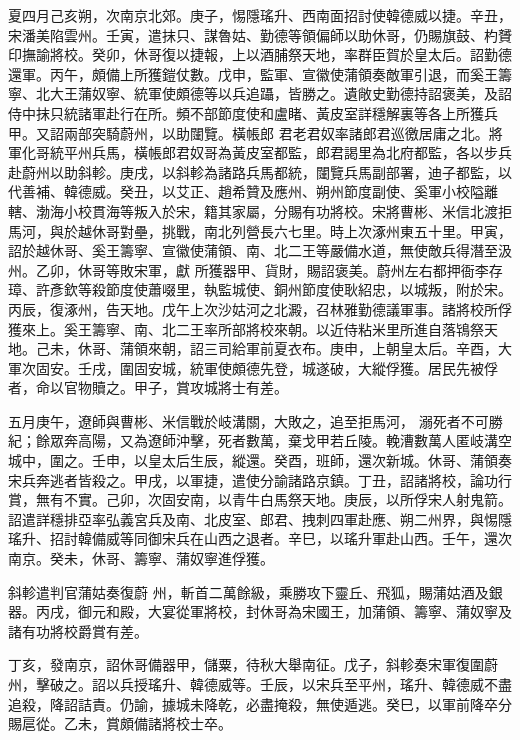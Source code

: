 \begin{pinyinscope}
 夏四月己亥朔，次南京北郊。庚子，惕隱瑤升、西南面招討使韓德威以捷。辛丑，宋潘美陷雲州。壬寅，遣抹只、謀魯姑、勤德等領偏師以助休哥，仍賜旗鼓、杓贇印撫諭將校。癸卯，休哥復以捷報，上以酒脯祭天地，率群臣賀於皇太后。詔勤德還軍。丙午，頗備上所獲鎧仗數。戊申，監軍、宣徽使蒲領奏敵軍引退，而奚王籌寧、北大王蒲奴寧、統軍使頗德等以兵追躡，皆勝之。遺敞史勤德持詔褒美，及詔侍中抹只統諸軍赴行在所。頻不部節度使和盧睹、黃皮室詳穩解裏等各上所獲兵甲。又詔兩部突騎蔚州，以助闥覽。橫帳郎
 君老君奴率諸郎君巡徼居庸之北。將軍化哥統平州兵馬，橫帳郎君奴哥為黃皮室都監，郎君謁里為北府都監，各以步兵赴蔚州以助斜軫。庚戌，以斜軫為諸路兵馬都統，闥覽兵馬副部署，迪子都監，以代善補、韓德威。癸丑，以艾正、趙希贊及應州、朔州節度副使、奚軍小校隘離轄、渤海小校貫海等叛入於宋，籍其家屬，分賜有功將校。宋將曹彬、米信北渡拒馬河，與於越休哥對壘，挑戰，南北列營長六七里。時上次涿州東五十里。甲寅，詔於越休哥、奚王籌寧、宣徽使蒲領、南、北二王等嚴備水道，無使敵兵得潛至汲州。乙卯，休哥等敗宋軍，獻
 所獲器甲、貨財，賜詔褒美。蔚州左右都押衙李存璋、許彥欽等殺節度使蕭啜里，執監城使、銅州節度使耿紹忠，以城叛，附於宋。丙辰，復涿州，告天地。戊午上次沙姑河之北澱，召林雅勤德議軍事。諸將校所俘獲來上。奚王籌寧、南、北二王率所部將校來朝。以近侍粘米里所進自落鴇祭天地。己未，休哥、蒲領來朝，詔三司給軍前夏衣布。庚申，上朝皇太后。辛酉，大軍次固安。壬戌，圍固安城，統軍使頗德先登，城遂破，大縱俘獲。居民先被俘者，命以官物贖之。甲子，賞攻城將士有差。



 五月庚午，遼師與曹彬、米信戰於岐溝關，大敗之，追至拒馬河，
 溺死者不可勝紀；餘眾奔高陽，又為遼師沖擊，死者數萬，棄戈甲若丘陵。輓漕數萬人匿岐溝空城中，圍之。壬申，以皇太后生辰，縱還。癸酉，班師，還次新城。休哥、蒲領奏宋兵奔逃者皆殺之。甲戌，以軍捷，遣使分諭諸路京鎮。丁丑，詔諸將校，論功行賞，無有不實。己卯，次固安南，以青牛白馬祭天地。庚辰，以所俘宋人射鬼箭。詔遣詳穩排亞率弘義宮兵及南、北皮室、郎君、拽刺四軍赴應、朔二州界，與惕隱瑤升、招討韓備威等同御宋兵在山西之退者。辛巳，以瑤升軍赴山西。壬午，還次南京。癸未，休哥、籌寧、蒲奴寧進俘獲。



 斜軫遣判官蒲姑奏復蔚
 州，斬首二萬餘級，乘勝攻下靈丘、飛狐，賜蒲姑酒及銀器。丙戌，御元和殿，大宴從軍將校，封休哥為宋國王，加蒲領、籌寧、蒲奴寧及諸有功將校爵賞有差。



 丁亥，發南京，詔休哥備器甲，儲粟，待秋大舉南征。戊子，斜軫奏宋軍復圍蔚州，擊破之。詔以兵授瑤升、韓德威等。壬辰，以宋兵至平州，瑤升、韓德威不盡追殺，降詔詰責。仍諭，據城未降乾，必盡掩殺，無使遁逃。癸巳，以軍前降卒分賜扈從。乙未，賞頗備諸將校士卒。




\end{pinyinscope}
